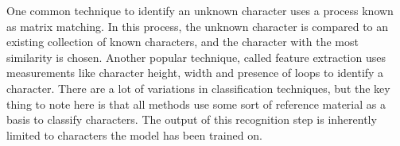 \documentclass[sigplan,screen,nonacm]{acmart-tagged}
\begin{document}

One common technique to identify an unknown character uses a process known as matrix matching. 
In this process, the unknown character is compared to an existing collection of known characters, and the character with the most similarity is chosen. \cite{Thorat:2022}
Another popular technique, called feature extraction uses measurements like character height, width and presence of loops to identify a character.
There are a lot of variations in classification techniques, but the key thing to note here is that all methods use some sort of reference material as a basis to classify characters. \cite{Thorat:2022}
The output of this recognition step is inherently limited to characters the model has been trained on.

%

%
%
%
%
\end{document}
